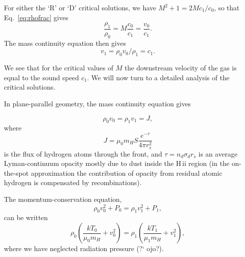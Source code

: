For either the `R' or `D' critical solutions, we have 
$M^2 + 1 = 2 M c_1/c_0$, so that Eq.~\ref{eq:rhofrac} gives 
\begin{equation}
\frac{\rho_1}{\rho_0}  = M \frac{c_0}{c_1} = \frac{v_0}{c_1}.
\end{equation}
The mass continuity equation then gives 
\begin{equation}
v_1 = \rho_0 v_0 / \rho_1 = c_1. 
\end{equation}

We see that for the critical values of $M$ the downstream velocity of
the gas is equal to the sound speed $c_1$.  We will now turn to a
detailed analysis of the critical solutions. 

%



In plane-parallel geometry, the mass continuity equation gives

\begin{equation}
\rho_0 v_0 = \rho_1 v_1 = J,  \label{eq:massHII}
\end{equation}
where 
\begin{equation}
 J = \mu_0 m_H S \frac{e^{-\tau}}{4\pi r_s^2}
\end{equation}
is the flux of hydrogen atoms through the front, and $\tau = n_d
\sigma_d r_s$ is an average Lyman-continuum opacity mostly due to dust
inside the H\,{\sc ii} region (in the on-the-spot approximation the
contribution of opacity from residual atomic hydrogen is compensated
by recombinations).




The momentum-conservation equation,
\begin{equation}
\rho_0 v_0^2 + P_0    =  \rho_1 v_1^2 + P_1, 
\end{equation}
can be written 
\begin{equation}
\rho_0 \left(\frac{k T_0}{\mu_0 m_H} + v_0^2 \right)  = 
\rho_1 \left(\frac{k T_1}{\mu_1 m_H} + v_1^2 \right),  \label{eq:momentumHII}
\end{equation}
where we have neglected radiation pressure (?` ojo?). 


